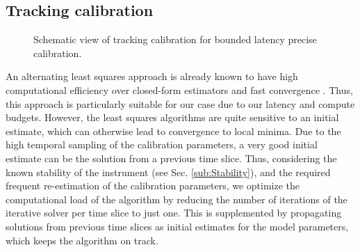 \documentclass{aa}
\begin{document}
\subsection{Tracking calibration}

\begin{figure}[tbh]

\caption{\label{fig:trackcalSchematic}Schematic view of tracking calibration
for bounded latency precise calibration.}
\end{figure}

An  alternating   least  squares  approach   is  already  known  to   have  high
computational  efficiency  over  closed-form  estimators  and  fast  convergence
\citep{boonstra2003gain}.  Thus, this approach  is particularly suitable for our
case  due  to our  latency  and compute  budgets.   However,  the least  squares
algorithms are quite sensitive to  an initial estimate, which can otherwise lead
to  convergence to  local  minima. Due  to  the high  temporal  sampling of  the
calibration parameters, a very good initial  estimate can be the solution from a
previous  time slice.  Thus, considering  the known  stability of  the instrument
(see Sec.  \ref{sub:Stability}), and  the required frequent re-estimation of the
calibration parameters, we  optimize the computational load of  the algorithm by
reducing the number of iterations of  the iterative solver per time slice to just
one. This is  supplemented by propagating solutions from  previous time slices as
initial estimates for the model parameters, which keeps the algorithm on track.
\end{document}
